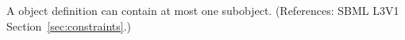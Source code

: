 A \Constraint object definition can contain at most one \Message
subobject.  (References: SBML L3V1 Section~\ref{sec:constraints}.)
